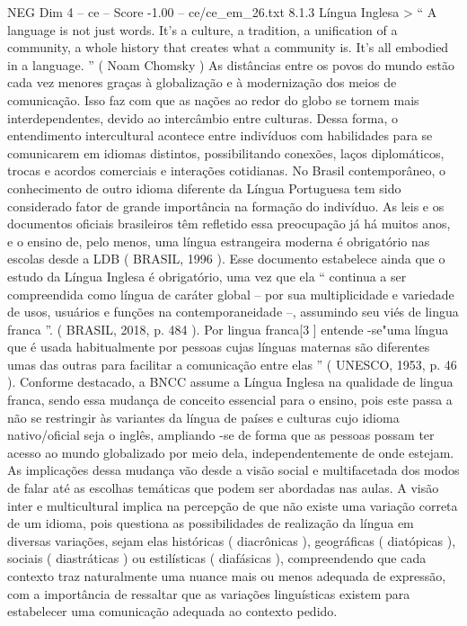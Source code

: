 \begin{textsample}{NEG Dim 4 – ce – Score -1.00 – ce/ce\_em\_26.txt}  \label{ex:f4_neg_158}
8.1.3 Língua Inglesa > “ A language is not just words.
It’s a culture, a tradition, a unification of a community, a whole history that creates what a community is.
It’s all embodied in a language. ” ( Noam Chomsky ) As distâncias entre os povos do mundo estão cada vez menores graças à globalização e à modernização dos meios de comunicação.
Isso faz com que as nações ao redor do globo se tornem mais interdependentes, devido ao intercâmbio entre culturas.
Dessa forma, o entendimento intercultural acontece entre indivíduos com habilidades para se comunicarem em idiomas distintos, possibilitando conexões, laços diplomáticos, trocas e acordos comerciais e interações cotidianas.
No Brasil contemporâneo, o conhecimento de outro idioma diferente da Língua Portuguesa tem sido considerado fator de grande importância na formação do indivíduo.
As leis e os documentos oficiais brasileiros têm refletido essa preocupação já há muitos anos, e o ensino de, pelo menos, uma língua estrangeira moderna é obrigatório nas escolas desde a LDB ( BRASIL, 1996 ).
Esse documento estabelece ainda que o estudo da Língua Inglesa é obrigatório, uma vez que ela “ continua a ser compreendida como língua de caráter global – por sua multiplicidade e variedade de usos, usuários e funções na contemporaneidade –, assumindo seu viés de lingua franca ”. ( BRASIL, 2018, p. 484 ).
Por lingua franca[3 ] entende -se"uma língua que é usada habitualmente por pessoas cujas línguas maternas são diferentes umas das outras para facilitar a comunicação entre elas ” ( UNESCO, 1953, p. 46 ).
Conforme destacado, a BNCC assume a Língua Inglesa na qualidade de lingua franca, sendo essa mudança de conceito essencial para o ensino, pois este passa a não se restringir às variantes da língua de países e culturas cujo idioma nativo/oficial seja o inglês, ampliando -se de forma que as pessoas possam ter acesso ao mundo globalizado por meio dela, independentemente de onde estejam.
As implicações dessa mudança vão desde a visão social e multifacetada dos modos de falar até as escolhas temáticas que podem ser abordadas nas aulas.
A visão inter e multicultural implica na percepção de que não existe uma variação correta de um idioma, pois questiona as possibilidades de realização da língua em diversas variações, sejam elas históricas ( diacrônicas ), geográficas ( diatópicas ), sociais ( diastráticas ) ou estilísticas ( diafásicas ), compreendendo que cada contexto traz naturalmente uma nuance mais ou menos adequada de expressão, com a importância de ressaltar que as variações linguísticas existem para estabelecer uma comunicação adequada ao contexto pedido.

\end{textsample}
